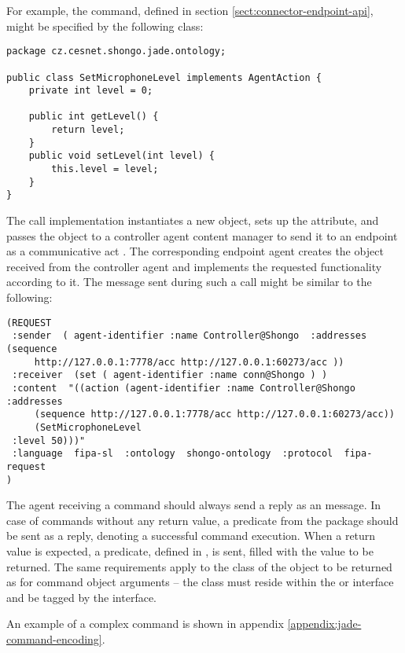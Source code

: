 For example, the  command, defined in section \ref{sect:connector-endpoint-api}, might be specified by the following class:
\begin{verbatim}
package cz.cesnet.shongo.jade.ontology;

public class SetMicrophoneLevel implements AgentAction {
    private int level = 0;

    public int getLevel() {
        return level;
    }
    public void setLevel(int level) {
        this.level = level;
    }
}
\end{verbatim}
The  call implementation instantiates a new  object, sets up the  attribute, and passes the object to a controller agent content manager to send it to an endpoint as a  communicative act \cite{FIPA-ComActSpec}. The corresponding endpoint agent creates the  object received from the controller agent and implements the requested functionality according to it. The message sent during such a call might be similar to the following:
\begin{verbatim}
(REQUEST
 :sender  ( agent-identifier :name Controller@Shongo  :addresses (sequence
     http://127.0.0.1:7778/acc http://127.0.0.1:60273/acc ))
 :receiver  (set ( agent-identifier :name conn@Shongo ) )
 :content  "((action (agent-identifier :name Controller@Shongo :addresses
     (sequence http://127.0.0.1:7778/acc http://127.0.0.1:60273/acc))
     (SetMicrophoneLevel
 :level 50)))"
 :language  fipa-sl  :ontology  shongo-ontology  :protocol  fipa-request
)
\end{verbatim}

The agent receiving a command should always send a reply as an  \cite{FIPA-ComActSpec} message. In case of commands without any return value, a  predicate from the package  should be sent as a reply, denoting a successful command execution. When a return value is expected, a  predicate, defined in \cite{FIPA-SL}, is sent, filled with the value to be returned. The same requirements apply to the class of the object to be returned as for command object arguments -- the class must reside within the  or  interface and be tagged by the  interface.

An example of a complex command is shown in appendix \ref{appendix:jade-command-encoding}.


